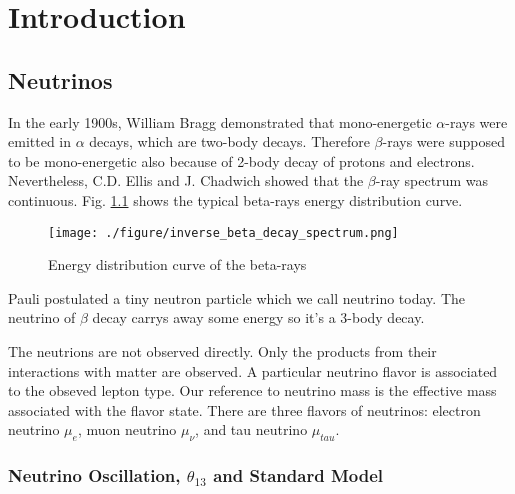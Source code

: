
\chapter{Introduction}

\section{Neutrinos}

In the early 1900s, William Bragg demonstrated that mono-energetic $\alpha$-rays
were emitted in $\alpha$ decays, which are two-body decays. Therefore $\beta$-rays
were supposed to be mono-energetic also because of 2-body decay of protons and
electrons. Nevertheless, C.D. Ellis and J. Chadwich showed that the $\beta$-ray
spectrum was continuous. Fig. \ref{fig:inverse_beta_decay_spectrum.png} shows the typical beta-rays energy distribution curve.


\begin{figure}
    \centering
    \texttt{[image: ./figure/inverse\_beta\_decay\_spectrum.png]}
    \caption{Energy distribution curve of the beta-rays \cite{Scott:1935}}
    \label{fig:inverse_beta_decay_spectrum.png}
    \end{figure}


Pauli postulated a tiny neutron particle which we call neutrino today. The neutrino
of $\beta$ decay carrys away some energy so it's a 3-body decay.

The neutrions are not observed directly. Only the products from their interactions
with matter are observed. A particular neutrino flavor is associated to the obseved lepton type.
Our reference to neutrino mass is the effective mass
associated with the flavor state.
There are three flavors of neutrinos: electron neutrino $\mu_e$, muon neutrino $\mu_{\nu}$, and
tau neutrino $\mu_{tau}$.




\subsection{Neutrino Oscillation, $\theta_{13}$ and Standard Model}



